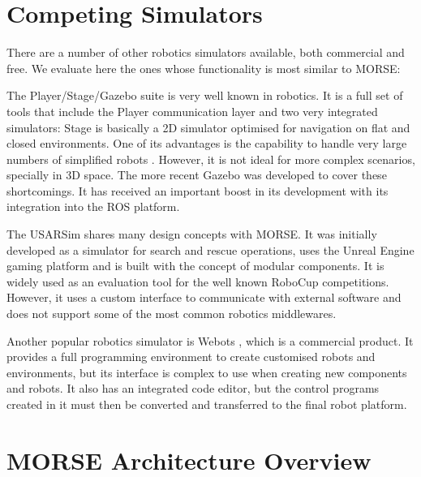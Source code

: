 \documentclass{llncs}
\begin{document}
\section{Competing Simulators}
\label{section:othersims}

There are a number of other robotics simulators available, both commercial and
free. We evaluate here the ones whose functionality is most similar to MORSE:

The Player/Stage/Gazebo suite \cite{psg-1232} is very well known in robotics.
It is a full set of tools that include the Player communication layer and two
very integrated simulators: Stage \cite{Gerkey03theplayer/stage} is basically a
2D simulator optimised for navigation on flat and closed environments.
One of its advantages is the capability to handle very large numbers of
simplified robots \cite{springerlink:10.1007/s11721-008-0014-4}. However, it is
not ideal for more complex scenarios, specially in 3D space.  The more recent
Gazebo \cite{Koenig04designand} was developed to cover these shortcomings.
It has received an important boost in its development with its integration
into the ROS platform.

The USARSim \cite{usarsim-4209284} shares many design concepts with MORSE. It
was initially developed as a simulator for search and rescue operations, uses
the Unreal Engine gaming platform and is built with the concept of modular
components. It is widely used as an evaluation tool for the well known RoboCup
competitions. However, it uses a custom interface to communicate with external
software and does not support some of the most common robotics middlewares.

Another popular robotics simulator is Webots \cite{Webots04}, which is a
commercial product. It provides a full programming environment to create
customised robots and environments, but its interface is complex to use when
creating new components and robots.
It also has an integrated code editor, but the control programs created in it
must then be converted and transferred to the final robot platform.




\section{MORSE Architecture Overview}
\label{section:overview}
\end{document}
